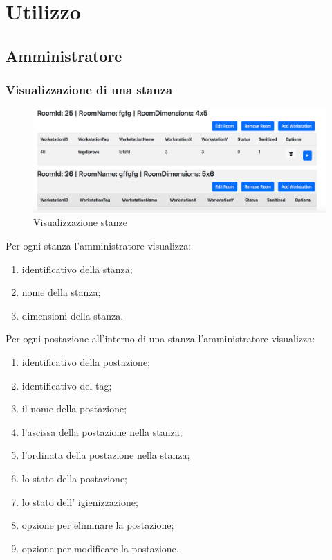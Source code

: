 \section{Utilizzo}

\subsection{Amministratore}

\subsubsection{Visualizzazione di una stanza}
\begin{figure}[H]
	\centering
	\includegraphics[width=15cm]{res/images/visStanza.png}
	\caption{Visualizzazione stanze}
\end{figure}
Per ogni stanza l'amministratore visualizza:
\begin{enumerate}
\item identificativo della stanza;
\item nome della stanza;
\item dimensioni della stanza.
\end{enumerate}
Per ogni postazione all'interno di una stanza l'amministratore visualizza:
\begin{enumerate}
\item identificativo della postazione;
\item identificativo del tag;
\item il nome della postazione;
\item l'ascissa della postazione nella stanza;
\item l'ordinata della postazione nella stanza;
\item lo stato della postazione;
\item lo stato dell' igienizzazione;
\item opzione per eliminare la postazione;
\item opzione per modificare la postazione.

\end{enumerate}


